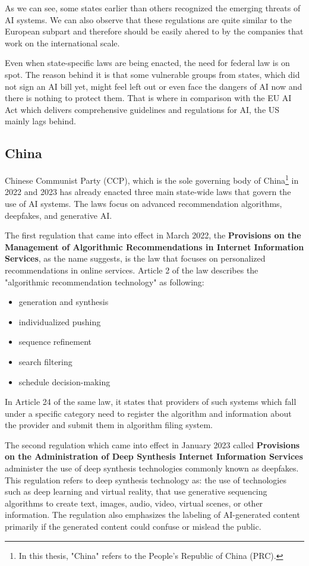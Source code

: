 As we can see, some states earlier than others recognized the emerging threats of AI systems. We can also observe that these regulations are quite similar to the European subpart and therefore should be easily ahered to by the companies that work on the international scale.

Even when state-specific laws are being enacted, the need for federal law is on spot. The reason behind it is that some vulnerable groups from states, which did not sign an AI bill yet, might feel left out or even face the dangers of AI now and there is nothing to protect them. That is where in comparison with the EU AI Act which delivers comprehensive guidelines and regulations for AI, the US mainly lags behind.

\subsection{China}
Chinese Communist Party (CCP), which is the sole governing body of China\footnote{In this thesis, "China" refers to the People's Republic of China (PRC).} in 2022 and 2023 has already enacted three main state-wide laws that govern the use of AI systems. The laws focus on advanced recommendation algorithms, deepfakes, and generative AI.

The first regulation that came into effect in March 2022, the \textbf{Provisions on the Management of Algorithmic Recommendations in Internet Information Services}\cite{ProvisionsAlgorithmicRecommendations2022}\cite{CACAlgorithmicRecommendations2022}, as the name suggests, is the law that focuses on personalized recommendations in online services. Article 2 of the law describes the "algorithmic recommendation technology" as following:
\begin{itemize}
    \item generation and synthesis
    \item individualized pushing
    \item sequence refinement
    \item search filtering
    \item schedule decision-making
\end{itemize}
In Article 24 of the same law, it states that providers of such systems which fall under a specific category need to register the algorithm and information about the provider and submit them in algorithm filing system.

The second regulation which came into effect in January 2023 called \textbf{Provisions on the Administration of Deep Synthesis Internet Information Services}\cite{ProvisionsDeepSynthesis2022}\cite{CACDeepSynthesisRegulations2023} administer the use of deep synthesis technologies commonly known as deepfakes. This regulation refers to deep synthesis technology as: the use of technologies such as deep learning and virtual reality, that use generative sequencing algorithms to create text, images, audio, video, virtual scenes, or other information. The regulation also emphasizes the labeling of AI-generated content primarily if the generated content could confuse or mislead the public.


